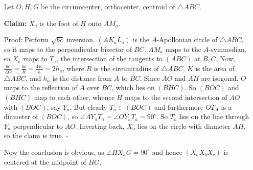Let $O,H,G$ be the circumcenter, orthocenter, centroid of $\triangle{ABC}$.

\textbf{Claim:} $X_a$ is the foot of $H$ onto $AM_a$.

Proof: Perform $\sqrt{bc}$ inversion. $\left(AK_aL_a\right)$ is the $A$-Apollonian circle of $\triangle{ABC}$, so it maps to the perpendicular bisector of $BC$. $AM_a$ maps to the $A$-symmedian, so $X_a$ maps to $T_a$, the intersection of the tangents to $\left(ABC\right)$ at $B,C$. Now, $\frac{bc}{AO}=\frac{bc}{R}=\frac{4K}{a}=2h_a$, where $R$ is the circumradius of $\triangle{ABC}$, $K$ is the area of $\triangle{ABC}$, and $h_a$ is the distance from $A$ to $BC$. Since $AO$ and $AH$ are isogonal, $O$ maps to the reflection of $A$ over $BC$, which lies on $\left(BHC\right)$. So $\left(BOC\right)$ and $\left(BHC\right)$ map to each other, whence $H$ maps to the second intersection of $AO$ with $\left(BOC\right)$, say $Y_a$. But clearly $T_a\in\left(BOC\right)$ and furthermore $OT_A$ is a diameter of $\left(BOC\right)$, so $\angle{AY_aT_a}=\angle{OY_aT_a}=90^\circ$. So $T_a$ lies on the line through $Y_a$ perpendicular to $AO$. Inverting back, $X_a$ lies on the circle with diameter $AH$, so the claim is true. $\square$

Now the conclusion is obvious, as $\angle{HX_aG}=90^\circ$ and hence $\left(X_aX_bX_c\right)$ is centered at the midpoint of $HG$.